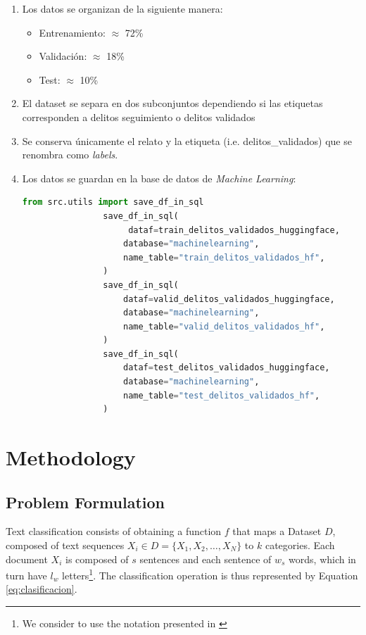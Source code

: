 \documentclass[onecolumn, journal, english, 12pt, a4paper]{IEEEtran} %
\theoremstyle{definition}
\begin{document}
\begin{enumerate}
        \item Los datos se organizan de la siguiente manera:
        \begin{itemize}
            \item Entrenamiento:  $\approx$ 72\%
            \item Validación:  $\approx$ 18\%
            \item Test:  $\approx$ 10\%
        \end{itemize}
        \item El dataset se separa en dos subconjuntos dependiendo si las etiquetas corresponden a delitos seguimiento o delitos validados
        \item Se conserva únicamente el relato y la etiqueta (i.e. delitos\_validados) que se renombra como \emph{labels}.
        \item Los datos se guardan en la base de datos de \emph{Machine Learning}:
            \scriptsize
            \begin{lstlisting}[language=Python]
                from src.utils import save_df_in_sql
                save_df_in_sql(
                     dataf=train_delitos_validados_huggingface,
                    database="machinelearning",
                    name_table="train_delitos_validados_hf",
                )            
                save_df_in_sql(
                    dataf=valid_delitos_validados_huggingface,
                    database="machinelearning",
                    name_table="valid_delitos_validados_hf",
                )
                save_df_in_sql(
                    dataf=test_delitos_validados_huggingface,
                    database="machinelearning",
                    name_table="test_delitos_validados_hf",
                )
            \end{lstlisting}
        
    \end{enumerate}

\section{Methodology}\label{chap:metodos}
\subsection{Problem Formulation}

Text classification consists of obtaining a function $f$ that maps a
Dataset $D$, composed of text sequences
$X_i \in D=\{X_1, X_2, \dots, X_N\}$ to $k$ categories. Each document
$X_i$ is composed of $s$ sentences and each sentence of $w_s$ words,
which in turn have $l_w$ letters\footnote{We consider to use the
  notation presented in \cite{Kowsari2019}}. The classification
operation is thus represented by Equation \eqref{eq:clasificacion}.
\end{document}
